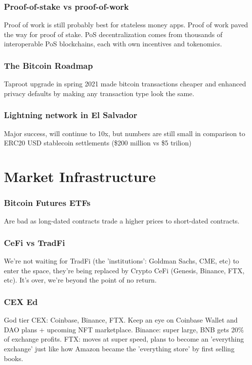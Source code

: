\documentclass{../notes}
\begin{document}
\section{Proof-of-stake vs proof-of-work}
Proof of work is still probably best for stateless money apps. Proof of work paved the way for proof of stake. PoS decentralization comes from thousands of interoperable PoS blockchains, each with own incentives and tokenomics. 

\section{The Bitcoin Roadmap}
Taproot upgrade in spring 2021 made bitcoin transactions cheaper and enhanced privacy defaults by making any transaction type look the same. 

\section{Lightning network in El Salvador}
Major success, will continue to 10x, but numbers are still small in comparison to ERC20 USD stablecoin settlements (\$200 million vs \$5 trilion)


\part{Market Infrastructure}
\section{Bitcoin Futures ETFs}
Are bad as long-dated contracts trade a higher prices to short-dated contracts. 

\section{CeFi vs TradFi}
We're not waiting for TradFi (the 'institutions': Goldman Sachs, CME, etc) to enter the space, they're being replaced by Crypto CeFi (Genesis, Binance, FTX, etc). It's over, we're beyond the point of no return. 

\section{CEX Ed}
God tier CEX: Coinbase, Binance, FTX. Keep an eye on Coinbase Wallet and DAO plans + upcoming NFT marketplace. Binance: super large, BNB gets 20\% of exchange profits. FTX: moves at super speed, plans to become an 'everything exchange' just like how Amazon became the 'everything store' by first selling books. 
\end{document}
